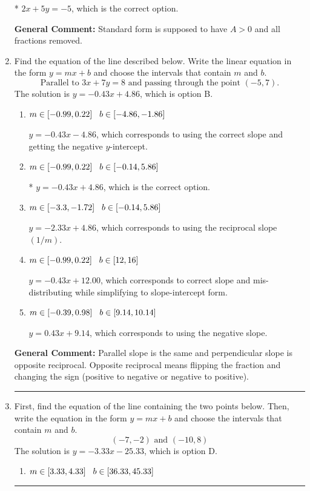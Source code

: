 \documentclass{extbook}[14pt]
\newcommand{\litem}[1]{\item #1

\rule{\textwidth}{0.4pt}}
\begin{document}
\begin{enumerate}
{\begin{enumerate}[label=\Alph*.]
* $2x + 5y = -5$, which is the correct option.
\end{enumerate}

\textbf{General Comment:} Standard form is supposed to have $A > 0$ and all fractions removed.
}
\litem{
Find the equation of the line described below. Write the linear equation in the form $ y=mx+b $ and choose the intervals that contain $m$ and $b$.
\[ \text{Parallel to } 3 x + 7 y = 8 \text{ and passing through the point } (-5, 7). \]The solution is \( y = -0.43x + 4.86 \), which is option B.\begin{enumerate}[label=\Alph*.]
\item \( m \in [-0.99, 0.22] \hspace*{3mm} b \in [-4.86, -1.86] \)

 $y = -0.43x - 4.86$, which corresponds to using the correct slope and getting the negative $y$-intercept.
\item \( m \in [-0.99, 0.22] \hspace*{3mm} b \in [-0.14, 5.86] \)

* $y = -0.43x + 4.86$, which is the correct option.
\item \( m \in [-3.3, -1.72] \hspace*{3mm} b \in [-0.14, 5.86] \)

 $y = -2.33x + 4.86$, which corresponds to using the reciprocal slope $(1/m)$.
\item \( m \in [-0.99, 0.22] \hspace*{3mm} b \in [12, 16] \)

 $y = -0.43x + 12.00$, which corresponds to correct slope and mis-distributing while simplifying to slope-intercept form.
\item \( m \in [-0.39, 0.98] \hspace*{3mm} b \in [9.14, 10.14] \)

 $y = 0.43x + 9.14$, which corresponds to using the negative slope.
\end{enumerate}

\textbf{General Comment:} Parallel slope is the same and perpendicular slope is opposite reciprocal. Opposite reciprocal means flipping the fraction and changing the sign (positive to negative or negative to positive).
}
\litem{
First, find the equation of the line containing the two points below. Then, write the equation in the form $ y=mx+b $ and choose the intervals that contain $m$ and $b$.
\[ (-7, -2) \text{ and } (-10, 8) \]The solution is \( y = -3.33x -25.33 \), which is option D.\begin{enumerate}[label=\Alph*.]
\item \( m \in [3.33, 4.33] \hspace*{3mm} b \in [36.33, 45.33] \)


\end{enumerate}}
\end{enumerate}
\end{document}
